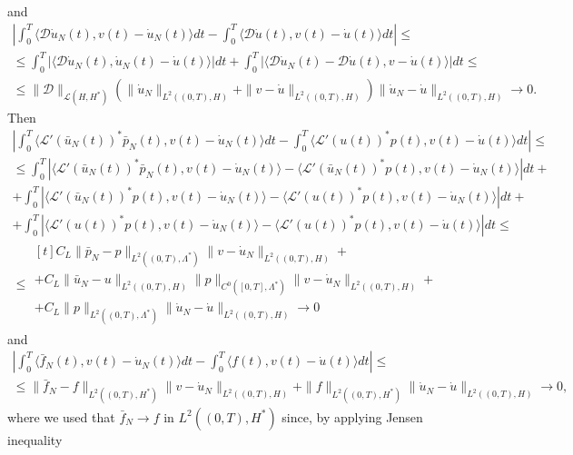 \documentclass[a4paper,10pt,oneside]{amsbook}
\numberwithin{section}{chapter}
\numberwithin{equation}{chapter}
\theoremstyle{definition}
\begin{document}
and
\[
\begin{multlined}
\left|\int_0^T\langle \mathcal{D}\dot{u}_N(t),v(t)-\dot{u}_N(t)\rangle dt-\int_0^T\langle\mathcal{D}\dot{u}(t),v(t)-\dot{u}(t)\rangle dt\right|\le\\
\le\int_0^T\left|\langle\mathcal{D}\dot{u}_N(t),\dot{u}_N(t)-\dot{u}(t)\rangle\right|dt+\int_0^T\left|\langle\mathcal{D}\dot{u}_N(t)-\mathcal{D}\dot{u}(t),v-\dot{u}(t)\rangle\right|dt\le\\
\le\|\mathcal{D}\|_{\mathscr{L}(H,H^*)}\left(\|\dot{u}_N\|_{L^2((0,T),H)}+\|v-\dot{u}\|_{L^2((0,T),H)}\right)\|\dot{u}_N-\dot{u}\|_{L^2((0,T),H)}\to0.
\end{multlined}
\]
Then
\[
\begin{multlined}
\left|\int_0^T\langle\mathcal{L}'(\bar{u}_N(t))^*\bar{p}_N(t),v(t)-\dot{u}_N(t)\rangle dt-\int_0^T\langle\mathcal{L}'(u(t))^*p(t),v(t)-\dot{u}(t)\rangle dt\right|\le\\
\le\int_0^T\left|\langle\mathcal{L}'(\bar{u}_N(t))^*\bar{p}_N(t),v(t)-\dot{u}_N(t)\rangle-\langle\mathcal{L}'(\bar{u}_N(t))^*p(t),v(t)-\dot{u}_N(t)\rangle\right|dt+\\
+\int_0^T\left|\langle\mathcal{L}'(\bar{u}_N(t))^*p(t),v(t)-\dot{u}_N(t)\rangle-\langle\mathcal{L}'(u(t))^*p(t),v(t)-\dot{u}_N(t)\rangle\right|dt+\\
+\int_0^T\left|\langle\mathcal{L}'(u(t))^*p(t),v(t)-\dot{u}_N(t)\rangle-\langle\mathcal{L}'(u(t))^*p(t),v(t)-\dot{u}(t)\rangle\right|dt\le\\
\le
\begin{multlined}[t]
C_L\|\bar{p}_N-p\|_{L^2((0,T),\Lambda^*)}\|v-\dot{u}_N\|_{L^2((0,T),H)}+\\
+C_L\|\bar{u}_N-u\|_{L^2((0,T),H)}\|p\|_{C^0([0,T],\Lambda^*)}\|v-\dot{u}_N\|_{L^2((0,T),H)}+\\
+C_L\|p\|_{L^2((0,T),\Lambda^*)}\|\dot{u}_N-\dot{u}\|_{L^2((0,T),H)}\to0
\end{multlined}
\end{multlined}
\]
and
\[
\begin{multlined}
\left|\int_0^T\langle\bar{f}_N(t),v(t)-\dot{u}_N(t)\rangle dt-\int_0^T\langle f(t),v(t)-\dot{u}(t)\rangle dt\right|\le\\
\le\|\bar{f}_N-f\|_{L^2((0,T),H^*)}\|v-\dot{u}_N\|_{L^2((0,T),H)}+\|f\|_{L^2((0,T),H^*)}\|\dot{u}_N-\dot{u}\|_{L^2((0,T),H)}\to0,
\end{multlined}
\]
where we used that $\bar f_N\to f$ in $L^2((0,T),H^*)$ since, by applying Jensen inequality
\end{document}
